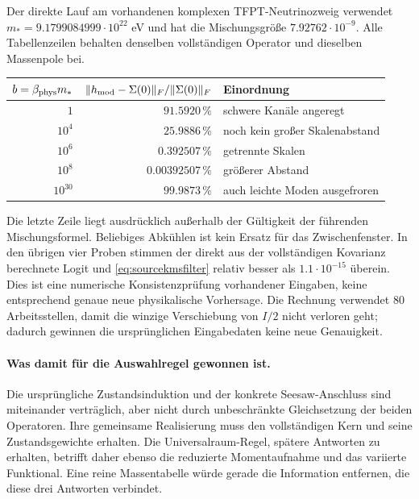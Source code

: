 Der direkte Lauf am vorhandenen komplexen TFPT-Neutrinozweig verwendet
$m_*=9.1799084999\cdot10^{22}$ eV und hat die Mischungsgröße
$7.92762\cdot10^{-9}$. Alle Tabellenzeilen behalten denselben
vollständigen Operator und dieselben Massenpole bei.
\begin{center}
\begin{tabular}{rrl}
\toprule
$b=\beta_{\rm phys}m_*$&
$\|h_{\rm mod}-\Sigma(0)\|_F/\|\Sigma(0)\|_F$&
Einordnung\\
\midrule
$1$      & $91.5920\,\%$ & schwere Kanäle angeregt\\
$10^4$   & $25.9886\,\%$ & noch kein großer Skalenabstand\\
$10^6$   & $0.392507\,\%$ & getrennte Skalen\\
$10^8$   & $0.00392507\,\%$ & größerer Abstand\\
$10^{30}$& $99.9873\,\%$ & auch leichte Moden ausgefroren\\
\bottomrule
\end{tabular}
\end{center}
Die letzte Zeile liegt ausdrücklich außerhalb der Gültigkeit der
führenden Mischungsformel. Beliebiges Abkühlen ist kein Ersatz für
das Zwischenfenster. In den übrigen vier Proben stimmen der direkt
aus der vollständigen Kovarianz berechnete Logit und
\eqref{eq:sourcekmsfilter} relativ besser als $1.1\cdot10^{-15}$ überein.
Dies ist eine numerische Konsistenzprüfung vorhandener Eingaben, keine
entsprechend genaue neue physikalische Vorhersage. Die Rechnung verwendet
80 Arbeitsstellen, damit die winzige Verschiebung von $I/2$ nicht verloren
geht; dadurch gewinnen die ursprünglichen Eingabedaten keine neue Genauigkeit.

\paragraph{Was damit für die Auswahlregel gewonnen ist.}
Die ursprüngliche Zustandsinduktion und der konkrete Seesaw-Anschluss
sind miteinander verträglich, aber nicht durch unbeschränkte Gleichsetzung
der beiden Operatoren. Ihre gemeinsame Realisierung muss den vollständigen
Kern und seine Zustandsgewichte erhalten. Die Universalraum-Regel,
spätere Antworten zu erhalten, betrifft daher ebenso die reduzierte
Momentaufnahme und das variierte Funktional. Eine reine Massentabelle
würde gerade die Information entfernen, die diese drei Antworten verbindet.

